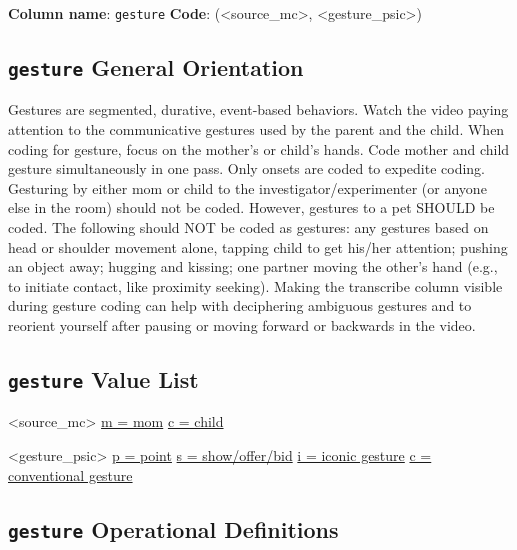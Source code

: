 \documentclass[
]{book}
\begin{document}
\textbf{Column name}: \texttt{gesture}
\textbf{Code}: (\textless source\_mc\textgreater, \textless gesture\_psic\textgreater)

\hypertarget{gesture-general-orientation}{%
\subsection*{\texorpdfstring{\texttt{gesture} General Orientation}{gesture General Orientation}}\label{gesture-general-orientation}}

Gestures are segmented, durative, event-based behaviors. Watch the video paying attention to the communicative gestures used by the parent and the child. When coding for gesture, focus on the mother's or child's hands.
Code mother and child gesture simultaneously in one pass. Only onsets are coded to expedite coding.
Gesturing by either mom or child to the investigator/experimenter (or anyone else in the room) should not be coded. However, gestures to a pet SHOULD be coded. The following should NOT be coded as gestures: any gestures based on head or shoulder movement alone, tapping child to get his/her attention; pushing an object away; hugging and kissing; one partner moving the other's hand (e.g., to initiate contact, like proximity seeking).
Making the transcribe column visible during gesture coding can help with deciphering ambiguous gestures and to reorient yourself after pausing or moving forward or backwards in the video.

\hypertarget{gesture_value_list}{%
\subsection*{\texorpdfstring{\texttt{gesture} Value List}{gesture Value List}}\label{gesture_value_list}}

\textless source\_mc\textgreater{}
\protect\hyperlink{mom}{m = mom}
\protect\hyperlink{child}{c = child}

\textless gesture\_psic\textgreater{}
\protect\hyperlink{point}{p = point}
\protect\hyperlink{show_offer_bid}{s = show/offer/bid}
\protect\hyperlink{iconic_gesture}{i = iconic gesture}
\protect\hyperlink{conventional_gesture}{c = conventional gesture}

\hypertarget{gesture-operational-definitions}{%
\subsection*{\texorpdfstring{\texttt{gesture} Operational Definitions}{gesture Operational Definitions}}\label{gesture-operational-definitions}}
\end{document}
